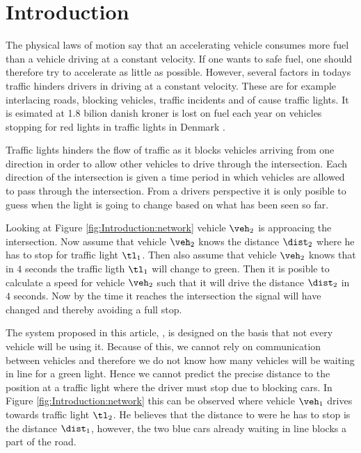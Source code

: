 \section{Introduction}

The physical laws of motion say that an accelerating vehicle consumes more fuel than a vehicle driving at a constant velocity. %
If one wants to safe fuel, one should therefore try to accelerate as little as possible. 
However, several factors in todays traffic hinders drivers in driving at a constant velocity. 
These are for example interlacing roads, blocking vehicles, traffic incidents and of cause traffic lights. 
It is esimated at 1.8 bilion danish kroner is lost on fuel each year on vehicles stopping for red lights in traffic lights in Denmark \cite{Vejdir}.

Traffic lights hinders the flow of traffic as it blocks vehicles arriving from one direction in order to allow other vehicles to drive through the intersection.
Each direction of the intersection is given a time period in which vehicles are allowed to pass through the intersection. 
From a drivers perspective it is only posible to guess when the light is going to change based on what has been seen so far. 

Looking at Figure \ref{fig:Introduction:network} vehicle $\veh_2$ is approacing the intersection.
Now assume that vehicle $\veh_2$ knows the distance $\dist_2$ where he has to stop for traffic light $\tl_1$. 
Then also assume that vehicle $\veh_2$ knows that in $4$ seconds the traffic ligth $\tl_1$ will change to green. 
Then it is posible to calculate a speed for vehicle $\veh_2$ such that it will drive the distance $\dist_2$ in $4$ seconds. 
Now by the time it reaches the intersection the signal will have changed and thereby avoiding a full stop.

The system proposed in this article, \tech, is designed on the basis that not every vehicle will be using it. 
Because of this, we cannot rely on communication between vehicles and therefore we do not know how many vehicles will be waiting in line for a green light. %
Hence we cannot predict the precise distance to the position at a traffic light where the driver must stop due to blocking cars. 
In Figure \ref{fig:Introduction:network} this can be observed where vehicle $\veh_1$ drives towards traffic light $\tl_2$. 
He believes that the distance to were he has to stop is the distance $\dist_1$, however, the two blue cars already waiting in line blocks a part of the road.

